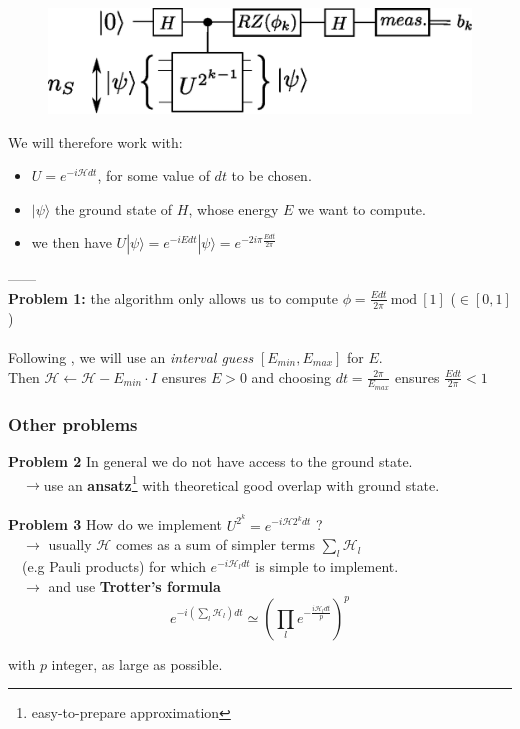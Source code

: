 \documentclass{beamer}
\begin{document}
\begin{frame}

\begin{center}
\begin{figure}
\includegraphics[width=.6\textwidth]{iterative_pea.eps}
\end{figure}
\end{center}

We will therefore work with:
\begin{itemize} 
\item $U=e^{-i\mathcal{H}dt}$, for some value of $dt$ to be chosen.
\item $|\psi\rangle$ the ground state of $H$, whose energy $E$ we want to compute.
\item we then have $U|\psi\rangle = e^{-iEdt}|\psi\rangle= e^{-2i\pi\frac{Edt}{2\pi}}$
\end{itemize}
------\\
\textbf{Problem 1:} the algorithm only allows us to compute $\phi=\frac{Edt}{2\pi}\: \text{mod}\: \left[1\right]$ ($\in \left[0,1\right]$)\\~\\
Following \textcolor{blue}{\cite{whitfield2011simulation}}, we will use an \emph{interval guess} $\left[E_{min},E_{max}\right]$ 
for $E$.\\
Then $\mathcal{H}\leftarrow \mathcal{H}-E_{min}\cdot I$ ensures $E>0$ and choosing $dt=\frac{2\pi}{E_{max}}$ ensures $\frac{Edt}{2\pi}<1$ 

\end{frame}

\begin{frame}
\frametitle{Other problems}
\textbf{Problem 2} In general we do not have access to the ground state.\\$\quad\rightarrow$use an \textbf{ansatz}\footnote{easy-to-prepare approximation} 
with theoretical good overlap with ground state.\\~\\

\textbf{Problem 3} How do we implement $U^{2^{k}} = e^{-i\mathcal{H}2^{k}dt}$ ?\\
$\quad\rightarrow$ usually $\mathcal{H}$ comes as a sum of simpler terms $\sum_{l} \mathcal{H}_{l}$\\
$\quad$(e.g Pauli products) for which $e^{-i\mathcal{H}_{l}dt}$ is simple to implement.\\
$\quad\rightarrow$ and use \textbf{Trotter's formula} \textcolor{blue}{\cite{whitfield2011simulation}} 
$$ e^{-i\left(\sum_{l}\mathcal{H}_{l}\right)dt} \simeq \left(\prod_{l} e^{-\frac{i\mathcal{H}_{l}dt}{p} }\right)^{p} $$ 

with $p$ integer, as large as possible.

\end{frame}



\end{document}
